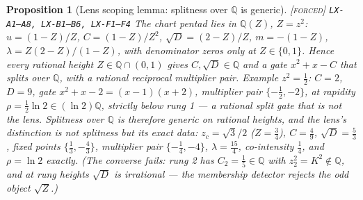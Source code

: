 \documentclass[11pt]{article}
\newcommand{\tagF}{\textcolor{cF}{\textsc{[forced]}}}
\newcommand{\hx}[1]{\textcolor{cC}{\footnotesize\texttt{#1}}}
\newcommand{\Q}{\mathbb{Q}}
\theoremstyle{plain}
\newtheorem{proposition}[theorem]{Proposition}
\theoremstyle{definition}
\theoremstyle{remark}
\begin{document}
\begin{proposition}[Lens scoping lemma: splitness over $\Q$ is generic]\label{prop:lensscope}\tagF{} \hx{LX-A1--A8, LX-B1--B6, LX-F1--F4}
The chart pentad lies in $\Q(Z)$, $Z=z^2$: $u=(1-Z)/Z$, $C=(1-Z)/Z^2$,
$\sqrt D=(2-Z)/Z$, $m=-(1-Z)$, $\lambda=Z(2-Z)/(1-Z)$, with denominator
zeros only at $Z\in\{0,1\}$. Hence \emph{every} rational height
$Z\in\Q\cap(0,1)$ gives $C,\sqrt D\in\Q$ and a gate $x^2+x-C$ that splits
over $\Q$, with a rational reciprocal multiplier pair. Example
$z^2=\tfrac12$: $C=2$, $D=9$, gate $x^2+x-2=(x-1)(x+2)$, multiplier pair
$\{-\tfrac12,-2\}$, at rapidity $\rho=\tfrac12\ln2\in(\ln2)\Q$, strictly
below rung 1 --- a rational split gate that is not the lens. Splitness over
$\Q$ is therefore \emph{generic} on rational heights, and the lens's
distinction is not splitness but its exact data: $z_c=\sqrt3/2$
($Z=\tfrac34$), $C=\tfrac49$, $\sqrt D=\tfrac53$, fixed points
$\{\tfrac13,-\tfrac43\}$, multiplier pair $\{-\tfrac14,-4\}$,
$\lambda=\tfrac{15}4$, co-intensity $\tfrac14$, and $\rho=\ln2$ exactly.
(The converse fails: rung 2 has $C_2=\tfrac15\in\Q$ with
$z_2^2=K^2\notin\Q$, and at rung heights $\sqrt D$ is irrational --- the
membership detector rejects the odd object $\sqrt Z$.)
\end{proposition}
\end{document}
